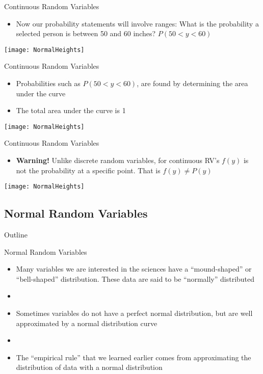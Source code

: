 \documentclass[xcolor=dvipsnames]{beamer}
\begin{document}
\begin{frame}{Continuous Random Variables}
	\begin{itemize}
		\item Now our probability statements will involve ranges: What is the probability a selected person is between 50 and 60 inches? $P(50 < y < 60)$ \pause
	\end{itemize}
\begin{center}
	\texttt{[image: NormalHeights]}
\end{center}
\end{frame}

\begin{frame}{Continuous Random Variables}
	\begin{itemize}
		\item Probabilities such as $P(50 < y < 60)$, are found by determining the area under the curve
		\item The total area under the curve is 1
	\end{itemize}
	\begin{center}
		\texttt{[image: NormalHeights]}
	\end{center}
\end{frame}

\begin{frame}{Continuous Random Variables}
	\begin{itemize}
		\item \textbf{Warning!} Unlike discrete random variables, for continuous RV's $f(y)$ is not the probability at a specific point. That is $f(y) \neq P(y)$ 
	\end{itemize}
	\begin{center}
		\texttt{[image: NormalHeights]}
	\end{center}
\end{frame}

\subsection{Normal Random Variables}
\begin{frame}{Outline}
	\tableofcontents[currentsection,subsectionstyle=show/shaded/hide]
\end{frame}

\begin{frame}{Normal Random Variables}
	\begin{itemize}
		\item Many variables we are interested in the sciences have a ``mound-shaped'' or ``bell-shaped'' distribution. These data are said to be ``normally'' distributed \pause
		\item[]
		\item Sometimes variables do not have a perfect normal distribution, but are well approximated by a normal distribution curve \pause
		\item[]
		\item The ``empirical rule'' that we learned earlier comes from approximating the distribution of data with a normal distribution
	\end{itemize}
\end{frame}
\end{document}
